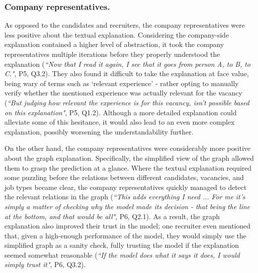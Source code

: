 \subsubsection{Company representatives.}
As opposed to the candidates and recruiters, the company representatives were less positive about the textual explanation. Considering the company-side explanation contained a higher level of abstraction, it took the company representatives multiple iterations before they properly understood the explanation (\textit{``Now that I read it again, I see that it goes from person A, to B, to C."}, P5, Q3.2). They also found it difficult to take the explanation at face value, being wary of terms such as `relevant experience' - rather opting to manually verify whether the mentioned experience was actually relevant for the vacancy (\textit{``But judging how relevant the experience is for this vacancy, isn't possible based on this explanation"}, P5, Q1.2). Although a more detailed explanation could alleviate some of this hesitance, it would also lead to an even more complex explanation, possibly worsening the understandability further. 

On the other hand, the company representatives were considerably more positive about the graph explanation. Specifically, the simplified view of the graph allowed them to grasp the prediction at a glance. Where the textual explanation required some puzzling before the relations between different candidates, vacancies, and job types became clear, the company representatives quickly managed to detect the relevant relations in the graph (\textit{``This adds everything I need ... For me it's simply a matter of checking why the model made its decision - that being the line at the bottom, and that would be all"}, P6, Q2.1). As a result, the graph explanation also improved their trust in the model; one recruiter even mentioned that, given a high-enough performance of the model, they would simply use the simplified graph as a sanity check, fully trusting the model if the explanation seemed somewhat reasonable (\textit{``If the model does what it says it does, I would simply trust it"}, P6, Q3.2). 

